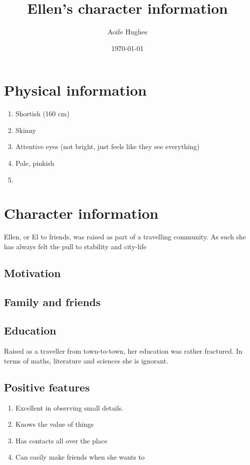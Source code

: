 \documentclass[11pt]{article}
\title{Ellen's character information}
\author{Aoife Hughes}
\date{\today}
\begin{document}
\maketitle	
\pagebreak


\section{Physical information}

\begin{enumerate}
    \item Shortish (160 cm)
    \item Skinny
    \item Attentive eyes (not bright, just feels like they see everything)
    \item Pale, pinkish
    \item 
\end{enumerate}

\section{Character information}

Ellen, or El to friends, was raised as part of a travelling community. As such
she has always felt the pull to stability and city-life

\subsection{Motivation}

\subsection{Family and friends}

\subsection{Education}
Raised as a traveller from town-to-town, her education was rather fractured. In
terms of maths, literature and sciences she is ignorant. 


\subsection{Positive features}
\begin{enumerate}
    \item Excellent in observing small details. 
    \item Knows the value of things
    \item Has contacts all over the place
    \item Can easily make friends when she wants to
\end{enumerate}
\end{document}
